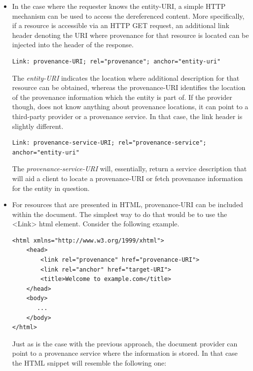 \begin{itemize}
  \item 
        In the case where the requester knows the entity-URI, a simple HTTP mechanism can be used to access the dereferenced content. More specifically, if a resource is accessible via an HTTP GET request, an additional link header denoting the URI where provenance for that resource is located can be injected into the header of the response.
        
\begin{verbatim}
Link: provenance-URI; rel="provenance"; anchor="entity-uri"
\end{verbatim}
        
        The \emph{entity-URI} indicates the location where additional description for that resource can be obtained, whereas the provenance-URI identifies the location of the provenance information which the entity is part of. If the provider though, does not know anything about provenance locations, it can point to a third-party provider or a provenance service. In that case, the link header is slightly different.
        
\begin{verbatim}
Link: provenance-service-URI; rel="provenance-service"; 
anchor="entity-uri"
\end{verbatim}
        
        The \emph{provenance-service-URI} will, essentially, return a service description that will aid a client to locate a provenance-URI or fetch provenance information for the entity in question.
        
  \item 
        For resources that are presented in HTML, provenance-URI can be included within the document. The simplest way to do that would be to use the <Link> html element. Consider the following example.
        
\begin{verbatim}
<html xmlns="http://www.w3.org/1999/xhtml">
    <head>
        <link rel="provenance" href="provenance-URI">
        <link rel="anchor" href="target-URI">
        <title>Welcome to example.com</title>
    </head>
    <body>
       ...
    </body>
</html>
\end{verbatim}
        
        Just as is the case with the previous approach, the document provider can point to a provenance service where the information is stored. In that case the HTML snippet will resemble the following one:
        

\end{itemize}
